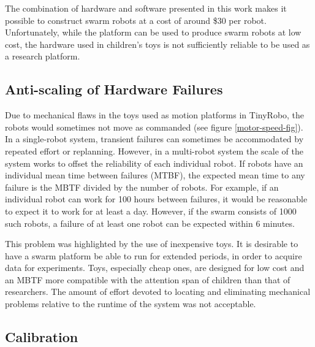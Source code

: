 \documentclass[]{article}
\begin{document}
The combination of hardware and software presented in this work makes it possible to construct swarm robots at a cost of around \$30 per robot. 
Unfortunately, while the platform can be used to produce swarm robots at low cost, the hardware used in children's toys is not sufficiently reliable to be used as a research platform. 

\subsection{Anti-scaling of Hardware Failures} \label{section:Anti_scaling_of_Hardware_Failures}

Due to mechanical flaws in the toys used as motion platforms in TinyRobo, the robots would sometimes not move as commanded (see figure \ref{motor-speed-fig}). 
In a single-robot system, transient failures can sometimes be accommodated by repeated effort or replanning. 
However, in a multi-robot system the scale of the system works to offset the reliability of each individual robot. 
If robots have an individual mean time between failures (MTBF), the expected mean time to any failure is the MBTF divided by the number of robots. 
For example, if an individual robot can work for 100 hours between failures, it would be reasonable to expect it to work for at least a day. 
However, if the swarm consists of 1000 such robots, a failure of at least one robot can be expected within 6 minutes. 

This problem was highlighted by the use of inexpensive toys. 
It is desirable to have a swarm platform be able to run for extended periods, in order to acquire data for experiments. 
Toys, especially cheap ones, are designed for low cost and an MBTF more compatible with the attention span of children than that of researchers. 
The amount of effort devoted to locating and eliminating mechanical problems relative to the runtime of the system was not acceptable.

\subsection{Calibration} \label{section:Calibration}
\end{document}

